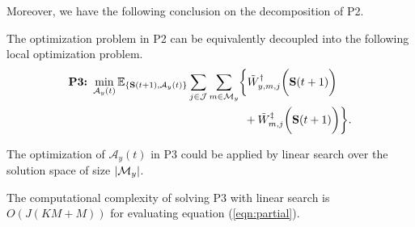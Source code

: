 Moreover, we have the following conclusion on the decomposition of P2.
\begin{lemma}[]
    The optimization problem in P2 can be equivalently decoupled into the following local optimization problem.
    {\small
    \begin{align}
        \textbf{P3:}~
        \min_{ \mathcal{A}_{y}(t) }
        \mathbb{E}_{\set{ \Stat(t+1), \mathcal{A}_{y}(t) }}
        &\sum_{j\in\jSpace} \sum_{m\in\esSet_{y}} \Brace{
            \tilde{W}^{\AP}_{y,m,j}\Paren{\Stat(t+1)}
            \nonumber\\
            &~~~~~~~~~~~~~~~+\tilde{W}^{\ES}_{m,j}\Paren{\Stat(t+1)}
        }.
        \label{eqn:partial}
    \end{align}
    }
\end{lemma}

The optimization of $\mathcal{A}_{y}(t)$ in P3 could be applied by linear search over the solution space of size $|\mathcal{M}_{y}|$.
\begin{remark}
    The computational complexity of solving P3 with linear search is $O(J(KM+M))$ for evaluating equation (\ref{eqn:partial}).
\end{remark}

